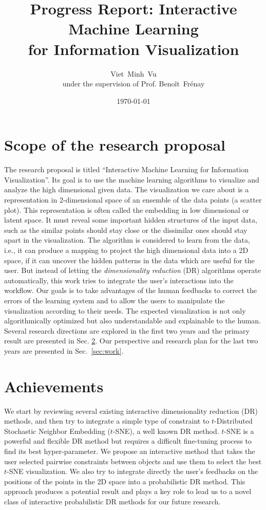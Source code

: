 \documentclass[11pt, a4paper]{article}
\title{Progress Report: Interactive Machine Learning\\ for Information Visualization}
\author{Viet~Minh~Vu\\ under the supervision of Prof. Beno\^it~Fr\'enay}
\date{\today}
\begin{document}
 
\maketitle

\section{Scope of the research proposal}
The research proposal is titled ``Interactive Machine Learning for Information Visualization''.
Its goal is to use the machine learning algorithms to visualize and analyze the high dimensional given data.
The visualization we care about is a representation in 2-dimensional space of an ensemble of the data points (a scatter plot).
This representation is often called the embedding in low dimensional or latent space.
It must reveal some important hidden structures of the input data, such as the similar points should stay close or the dissimilar ones should stay apart in the visualization.
The algorithm is considered to learn from the data, i.e., it can produce a mapping to project the high dimensional data into a 2D space, if it can uncover the hidden patterns in the data which are useful for the user.
But instead of letting the \emph{dimensionality reduction} (DR) algorithms operate automatically, this work tries to integrate the user's interactions into the workflow.
Our goals is to take advantages of the human feedbacks to correct the errors of the learning system and to allow the users to manipulate the visualization according to their needs.
The expected visualization is not only algorithmically optimized but also understandable and explainable to the human.
Several research directions are explored in the first two years and the primary result are presented in Sec. \ref{sec:results}. Our perspective and research plan for the last two years are presented in Sec.~\ref{sec:work}.


\section{Achievements}\label{sec:results}
We start by reviewing several existing interactive dimensionality reduction (DR) methods, and then try to integrate a simple type of constraint to $t$-Distributed Stochastic Neighbor Embedding ($t$-SNE), a well known DR method.
$t$-SNE is a powerful and flexible DR method but requires a difficult fine-tuning process to find its best hyper-parameter. We propose an interactive method that takes the user selected pairwise constraints between objects and use them to select the best $t$-SNE visualization.
We also try to integrate directly the user's feedbacks on the positions of the points in the 2D space into a probabilistic DR method.
This approach produces a potential result and plays a key role to lead us to a novel class of interactive probabilistic DR methods for our future research.
 
\end{document}
